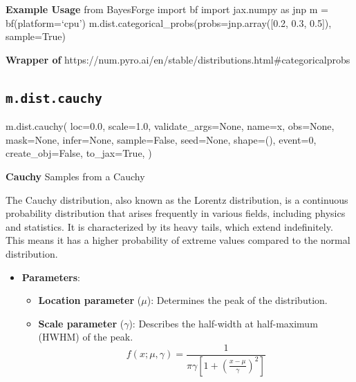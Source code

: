 \documentclass[
  letterpaper,
  DIV=11,
  numbers=noendperiod]{scrartcl}
\newenvironment{Shaded}{\begin{snugshade}}{\end{snugshade}}
\newcommand{\DecValTok}[1]{\textcolor[rgb]{0.68,0.00,0.00}{#1}}
\newcommand{\FloatTok}[1]{\textcolor[rgb]{0.68,0.00,0.00}{#1}}
\newcommand{\NormalTok}[1]{\textcolor[rgb]{0.00,0.23,0.31}{#1}}
\newcommand{\OperatorTok}[1]{\textcolor[rgb]{0.37,0.37,0.37}{#1}}
\newcommand{\StringTok}[1]{\textcolor[rgb]{0.13,0.47,0.30}{#1}}
\newcommand{\VariableTok}[1]{\textcolor[rgb]{0.07,0.07,0.07}{#1}}
\providecommand{\tightlist}{%
  \setlength{\itemsep}{0pt}\setlength{\parskip}{0pt}}\usepackage{longtable,booktabs,array}
\begin{document}
\textbf{Example Usage} from BayesForge import bf import jax.numpy as jnp
m = bf(platform=`cpu') m.dist.categorical\_probs(probs=jnp.array({[}0.2,
0.3, 0.5{]}), sample=True)

\textbf{Wrapper of}
https://num.pyro.ai/en/stable/distributions.html\#categoricalprobs

\subsection{\texorpdfstring{\texttt{m.dist.cauchy}}{m.dist.cauchy}}\label{cauchy}

\begin{Shaded}
\begin{Highlighting}[]
\NormalTok{m.dist.cauchy(}
\NormalTok{    loc}\OperatorTok{=}\FloatTok{0.0}\NormalTok{,}
\NormalTok{    scale}\OperatorTok{=}\FloatTok{1.0}\NormalTok{,}
\NormalTok{    validate\_args}\OperatorTok{=}\VariableTok{None}\NormalTok{,}
\NormalTok{    name}\OperatorTok{=}\StringTok{\textquotesingle{}x\textquotesingle{}}\NormalTok{,}
\NormalTok{    obs}\OperatorTok{=}\VariableTok{None}\NormalTok{,}
\NormalTok{    mask}\OperatorTok{=}\VariableTok{None}\NormalTok{,}
\NormalTok{    infer}\OperatorTok{=}\VariableTok{None}\NormalTok{,}
\NormalTok{    sample}\OperatorTok{=}\VariableTok{False}\NormalTok{,}
\NormalTok{    seed}\OperatorTok{=}\VariableTok{None}\NormalTok{,}
\NormalTok{    shape}\OperatorTok{=}\NormalTok{(),}
\NormalTok{    event}\OperatorTok{=}\DecValTok{0}\NormalTok{,}
\NormalTok{    create\_obj}\OperatorTok{=}\VariableTok{False}\NormalTok{,}
\NormalTok{    to\_jax}\OperatorTok{=}\VariableTok{True}\NormalTok{,}
\NormalTok{)}
\end{Highlighting}
\end{Shaded}

\textbf{Cauchy} Samples from a Cauchy

The Cauchy distribution, also known as the Lorentz distribution, is a
continuous probability distribution that arises frequently in various
fields, including physics and statistics. It is characterized by its
heavy tails, which extend indefinitely. This means it has a higher
probability of extreme values compared to the normal distribution.

\begin{itemize}
\tightlist
\item
  \textbf{Parameters}:

  \begin{itemize}
  \tightlist
  \item
    \textbf{Location parameter} (\(\mu\)): Determines the peak of the
    distribution.
  \item
    \textbf{Scale parameter} (\(\gamma\)): Describes the half-width at
    half-maximum (HWHM) of the peak. \[
      f(x; \mu, \gamma) = \frac{1}{\pi \gamma \left[1 + \left(\frac{x - \mu}{\gamma}\right)^2\right]}
      \]
  \end{itemize}
\end{itemize}
\end{document}
